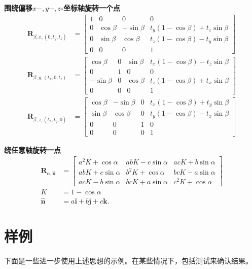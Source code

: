 \textbf{围绕偏移$x-, y-, z$-坐标轴旋转一个点}
$$
\begin{aligned}
\mathbf{R}_{\beta, x,\left(0, t_{y}, t_{z}\right)} & =\left[\begin{array}{cccc}
1 & 0 & 0 & 0 \\
0 & \cos \beta & -\sin \beta & t_{y}(1-\cos \beta)+t_{z} \sin \beta \\
0 & \sin \beta & \cos \beta & t_{z}(1-\cos \beta)-t_{y} \sin \beta \\
0 & 0 & 0 & 1
\end{array}\right] \\
\mathbf{R}_{\beta, y,\left(t_{x}, 0, t_{z}\right)} & =\left[\begin{array}{cccc}
\cos \beta & 0 & \sin \beta & t_{x}(1-\cos \beta)-t_{z} \sin \beta \\
0 & 1 & 0 & 0 \\
-\sin \beta & 0 & \cos \beta & t_{z}(1-\cos \beta)+t_{x} \sin \beta \\
0 & 0 & 0 & 1
\end{array}\right] \\
\mathbf{R}_{\beta, z,\left(t_{x}, t_{y}, 0\right)} & =\left[\begin{array}{cccc}
\cos \beta & -\sin \beta & 0 & t_{x}(1-\cos \beta)+t_{y} \sin \beta \\
\sin \beta & \cos \beta & 0 & t_{y}(1-\cos \beta)-t_{x} \sin \beta \\
0 & 0 & 1 & 0 \\
0 & 0 & 0 & 1
\end{array}\right]
\end{aligned}
$$

\textbf{绕任意轴旋转一点}
$$
\begin{aligned}
\mathbf{R}_{\alpha, \hat{\mathbf{n}}} & =\left[\begin{array}{ccc}
a^{2} K+\cos \alpha & a b K-c \sin \alpha & a c K+b \sin \alpha \\
a b K+c \sin \alpha & b^{2} K+\cos \alpha & b c K-a \sin \alpha \\
a c K-b \sin \alpha & b c K+a \sin \alpha & c^{2} K+\cos \alpha
\end{array}\right] \\
K & =1-\cos \alpha \\
\hat{\mathbf{n}} & =a \mathbf{i}+b \mathbf{j}+c \mathbf{k} .
\end{aligned}
$$

\section{样例}
下面是一些进一步使用上述思想的示例。在某些情况下，包括测试来确认结果。

